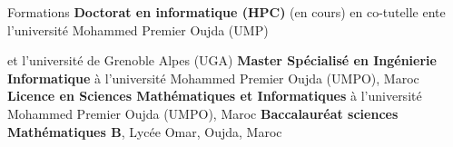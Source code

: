
\begin{rubric}{Formations}
\entry*[]%
    \textbf{Doctorat en informatique (HPC)} (en cours) en co-tutelle ente l'université Mohammed Premier Oujda (UMP) 
    \hfill {}
    \par   et   l'université de Grenoble Alpes (UGA)
%
\entry*[]%
    \textbf{Master Spécialisé en Ingénierie Informatique} à l'université Mohammed Premier Oujda (UMPO), Maroc
    \hfill {}
%
\entry*[]%
    \textbf{Licence en Sciences Mathématiques et Informatiques} à l'université Mohammed Premier Oujda (UMPO), Maroc
        \hfill {}
%
%
\entry*[]%
    \textbf{Baccalauréat sciences Mathématiques B}, Lycée Omar, Oujda, Maroc
        \hfill {}
\end{rubric}
